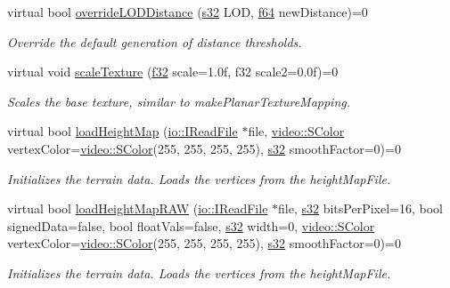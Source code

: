 \begin{DoxyCompactItemize}
virtual bool \hyperlink{classirr_1_1scene_1_1ITerrainSceneNode_af98b54e1a59c014d60ea888eba6010d7}{override\+L\+O\+D\+Distance} (\hyperlink{namespaceirr_ac66849b7a6ed16e30ebede579f9b47c6}{s32} L\+OD, \hyperlink{namespaceirr_a1325b02603ad449f92c68fc640af9b28}{f64} new\+Distance)=0
\begin{DoxyCompactList}\small\item\em Override the default generation of distance thresholds. \end{DoxyCompactList}\item 
virtual void \hyperlink{classirr_1_1scene_1_1ITerrainSceneNode_aacfb35db09be74e32c22a10c7e13bbcc}{scale\+Texture} (\hyperlink{namespaceirr_a0277be98d67dc26ff93b1a6a1d086b07}{f32} scale=1.\+0f, f32 scale2=0.\+0f)=0
\begin{DoxyCompactList}\small\item\em Scales the base texture, similar to make\+Planar\+Texture\+Mapping. \end{DoxyCompactList}\item 
virtual bool \hyperlink{classirr_1_1scene_1_1ITerrainSceneNode_ae5c598195e3faafb7cc58b71beb7ee1b}{load\+Height\+Map} (\hyperlink{classirr_1_1io_1_1IReadFile}{io\+::\+I\+Read\+File} $\ast$file, \hyperlink{classirr_1_1video_1_1SColor}{video\+::\+S\+Color} vertex\+Color=\hyperlink{classirr_1_1video_1_1SColor}{video\+::\+S\+Color}(255, 255, 255, 255), \hyperlink{namespaceirr_ac66849b7a6ed16e30ebede579f9b47c6}{s32} smooth\+Factor=0)=0
\begin{DoxyCompactList}\small\item\em Initializes the terrain data. Loads the vertices from the height\+Map\+File. \end{DoxyCompactList}\item 
virtual bool \hyperlink{classirr_1_1scene_1_1ITerrainSceneNode_a43d92272d8d860dda1c74b9fe795f062}{load\+Height\+Map\+R\+AW} (\hyperlink{classirr_1_1io_1_1IReadFile}{io\+::\+I\+Read\+File} $\ast$file, \hyperlink{namespaceirr_ac66849b7a6ed16e30ebede579f9b47c6}{s32} bits\+Per\+Pixel=16, bool signed\+Data=false, bool float\+Vals=false, \hyperlink{namespaceirr_ac66849b7a6ed16e30ebede579f9b47c6}{s32} width=0, \hyperlink{classirr_1_1video_1_1SColor}{video\+::\+S\+Color} vertex\+Color=\hyperlink{classirr_1_1video_1_1SColor}{video\+::\+S\+Color}(255, 255, 255, 255), \hyperlink{namespaceirr_ac66849b7a6ed16e30ebede579f9b47c6}{s32} smooth\+Factor=0)=0
\begin{DoxyCompactList}\small\item\em Initializes the terrain data. Loads the vertices from the height\+Map\+File. \end{DoxyCompactList}\end{DoxyCompactItemize}
